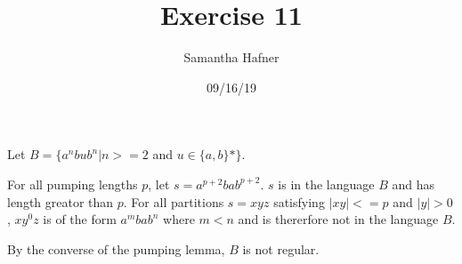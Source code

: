 \documentclass[12pt]{article}
\title{Exercise 11}
\author{Samantha Hafner}
\date{09/16/19}
\begin{document}
\maketitle

Let $B=\{a^nbub^n | n>=2$ and $u \in \{a,b\}\mbox{*}\}$.

For all pumping lengths $p$, let $s = a^{p+2} b a b^{p+2}$. $s$ is in the language $B$ and has length greator than $p$. For all partitions $s = xyz$ satisfying $|xy| <= p$ and $|y| > 0$, $xy^0z$ is of the form $a^mbab^n$ where $m < n$ and is thererfore not in the language $B$.

By the converse of the pumping lemma, $B$ is not regular.
  
\end{document}
